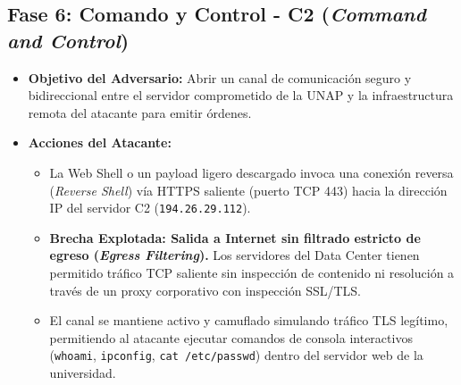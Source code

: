 \subsection*{Fase 6: Comando y Control - C2 (\textit{Command and Control})}
\begin{itemize}
    \item \textbf{Objetivo del Adversario:} Abrir un canal de comunicación seguro y bidireccional entre el servidor comprometido de la UNAP y la infraestructura remota del atacante para emitir órdenes.
    \item \textbf{Acciones del Atacante:}
    \begin{itemize}
        \item La Web Shell o un payload ligero descargado invoca una conexión reversa (\textit{Reverse Shell}) vía HTTPS saliente (puerto TCP 443) hacia la dirección IP del servidor C2 (\texttt{194.26.29.112}).
        \item \textbf{Brecha Explotada: Salida a Internet sin filtrado estricto de egreso (\textit{Egress Filtering}).} Los servidores del Data Center tienen permitido tráfico TCP saliente sin inspección de contenido ni resolución a través de un proxy corporativo con inspección SSL/TLS.
        \item El canal se mantiene activo y camuflado simulando tráfico TLS legítimo, permitiendo al atacante ejecutar comandos de consola interactivos (\texttt{whoami}, \texttt{ipconfig}, \texttt{cat /etc/passwd}) dentro del servidor web de la universidad.
    \end{itemize}
\end{itemize}

